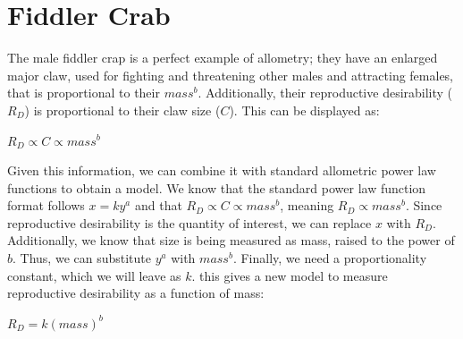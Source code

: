 \documentclass[10pt,letterpaper]{article}
\begin{document}
	\section{Fiddler Crab}
		The male fiddler crap is a perfect example of allometry; they have an enlarged major claw, used for fighting and threatening other males and attracting females, that is proportional to their $mass^{b}$. Additionally, their reproductive desirability ($R_{D}$) is proportional to their claw size ($C$). This can be displayed as:
		\newline \newline
		\centerline{$R_{D} \propto C \propto mass^{b}$}
		\newline \newline
		Given this information, we can combine it with standard allometric power law functions to obtain a model. We know that the standard power law function format follows $x = ky^{a}$ and that $R_{D} \propto C \propto mass^{b}$, meaning $R_{D} \propto mass^{b}$. Since reproductive desirability is the quantity of interest, we can replace $x$ with $R_{D}$. Additionally, we know that size is being measured as mass, raised to the power of $b$. Thus, we can substitute $y^{a}$ with $mass^{b}$. Finally, we need a proportionality constant, which we will leave as $k$. this gives a new model to measure reproductive desirability as a function of mass:
		\newline \newline
		\centerline{$R_{D} = k (mass)^{b}$}
\end{document}
